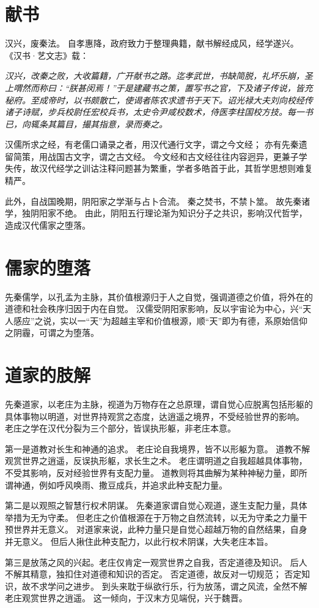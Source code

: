 \documentclass[11pt]{article}
\begin{document}
\section{献书}
汉兴，废秦法。
自孝惠降，政府致力于整理典籍，献书解经成风，经学遂兴。
《汉书·艺文志》载：

\textit{汉兴，改秦之败，大收篇籍，广开献书之路。迄孝武世，书缺简脱，礼坏乐崩，圣上喟然而称曰：“朕甚闵焉！”于是建藏书之策，置写书之官，下及诸子传说，皆充秘府。至成帝时，以书颇散亡，使谒者陈农求遗书于天下。诏光禄大夫刘向校经传诸子诗赋，步兵校尉任宏校兵书，太史令尹咸校数术，侍医李柱国校方技。每一书已，向辄条其篇目，撮其指意，录而奏之。}

汉儒所求之经，有老儒口诵录之者，用汉代通行文字，谓之今文经；
亦有先秦遗留简策，用战国古文字，谓之古文经。
今文经和古文经往往内容迥异，更兼子学失传，故汉代经学之训诂注释问题甚为繁重，学者多皓首于此，其哲学思想则难复精严。

\par

此外，自战国晚期，阴阳家之学渐与占卜合流。
秦之焚书，不禁卜筮。
故先秦诸学，独阴阳家不绝。
由此，阴阳五行理论渐为知识分子之共识，影响汉代哲学，造成汉代儒家之堕落。

\section{儒家的堕落}
先秦儒学，以孔孟为主脉，其价值根源归于人之自觉，强调道德之价值，将外在的道德和社会秩序归因于内在自觉。
汉儒受阴阳家影响，反以宇宙论为中心，兴“天人感应”之说，实以一“天”为超越主宰和价值根源，顺“天”即为有德，系原始信仰之阴霾，可谓之为堕落。

\section{道家的肢解}
先秦道家，以老庄为主脉，视道为万物存在之总原理，谓自觉心应脱离包括形躯的具体事物以明道，对世界持观赏之态度，达逍遥之境界，不受经验世界的影响。
老庄之学在汉代分裂为三个部分，皆误执形躯，非老庄本意。

\par

第一是道教对长生和神通的追求。
老庄论自我境界，皆不以形躯为意。
道教不解观赏世界之逍遥，反误执形躯，求长生之术。
老庄谓明道之自我超越具体事物，不受其影响，反对经验世界有支配力量。
道教则将其曲解为某种神秘力量，即所谓神通，例如呼风唤雨、撒豆成兵，并追求此种支配力量。

\par

第二是以观照之智慧行权术阴谋。
先秦道家谓自觉心观道，遂生支配力量，具体举措为无为守柔。
但老庄之价值根源在于万物之自然流转，以无为守柔之力量干预世界并无意义。
对道家来说，此种力量只是自觉心超越万物的自然结果，自身并无意义。
但后人揪住此种支配力，以此行权术阴谋，大失老庄本旨。

\par

第三是放荡之风的兴起。老庄仅肯定一观赏世界之自我，否定道德及知识。
后人不解其精意，独扣住对道德和知识的否定。
否定道德，故反对一切规范；
否定知识，故不求学问之进步。
到头来耽于纵欲行乐，行为放荡，谓之风流，全然不解老庄观赏世界之逍遥。
这一倾向，于汉末方见端倪，兴于魏晋。
\end{document}
